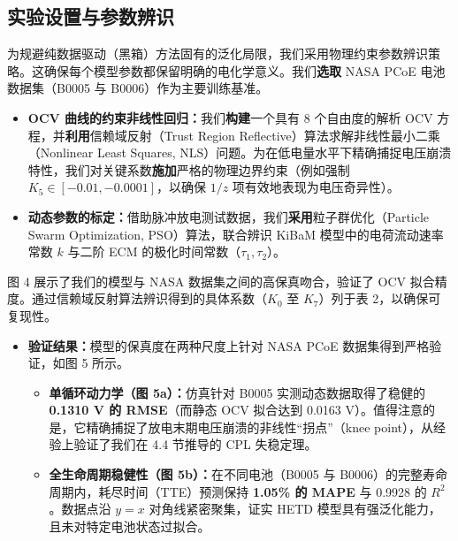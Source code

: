 \documentclass[11pt,a4paper]{ctexart}
\begin{document}
\subsection{实验设置与参数辨识}

为规避纯数据驱动（黑箱）方法固有的泛化局限，我们采用物理约束参数辨识策略。这确保每个模型参数都保留明确的电化学意义。我们\textbf{选取} NASA PCoE 电池数据集（B0005 与 B0006）作为主要训练基准。

\begin{itemize}[leftmargin=1.6em,itemsep=0.4em]
\item \textbf{OCV 曲线的约束非线性回归：}我们\textbf{构建}一个具有 8 个自由度的解析 OCV 方程，并\textbf{利用}信赖域反射（Trust Region Reflective）算法求解非线性最小二乘（Nonlinear Least Squares, NLS）问题。为在低电量水平下精确捕捉电压崩溃特性，我们对关键系数\textbf{施加}严格的物理边界约束（例如强制 $K_5 \in [-0.01, -0.0001]$，以确保 $1/z$ 项有效地表现为电压奇异性）。

\item \textbf{动态参数的标定：}借助脉冲放电测试数据，我们\textbf{采用}粒子群优化（Particle Swarm Optimization, PSO）算法，联合辨识 KiBaM 模型中的电荷流动速率常数 $k$ 与二阶 ECM 的极化时间常数（$\tau_1, \tau_2$）。
\end{itemize}

图 4 展示了我们的模型与 NASA 数据集之间的高保真吻合，验证了 OCV 拟合精度。通过信赖域反射算法辨识得到的具体系数（$K_0$ 至 $K_7$）列于表 2，以确保可复现性。

\begin{itemize}[leftmargin=1.6em,itemsep=0.4em]
\item \textbf{验证结果：}模型的保真度在两种尺度上针对 NASA PCoE 数据集得到严格验证，如图 5 所示。

\begin{itemize}[leftmargin=1.4em,itemsep=0.3em]
\item \textbf{单循环动力学（图 5a）：}仿真针对 B0005 实测动态数据取得了稳健的 \textbf{0.1310 V 的 RMSE}（而静态 OCV 拟合达到 0.0163 V）。值得注意的是，它精确捕捉了放电末期电压崩溃的非线性“拐点”（knee point），从经验上验证了我们在 4.4 节推导的 CPL 失稳定理。

\item \textbf{全生命周期稳健性（图 5b）：}在不同电池（B0005 与 B0006）的完整寿命周期内，耗尽时间（TTE）预测保持 \textbf{1.05\% 的 MAPE} 与 0.9928 的 $R^2$。数据点沿 $y = x$ 对角线紧密聚集，证实 HETD 模型具有强泛化能力，且未对特定电池状态过拟合。
\end{itemize}
\end{itemize}
\end{document}
